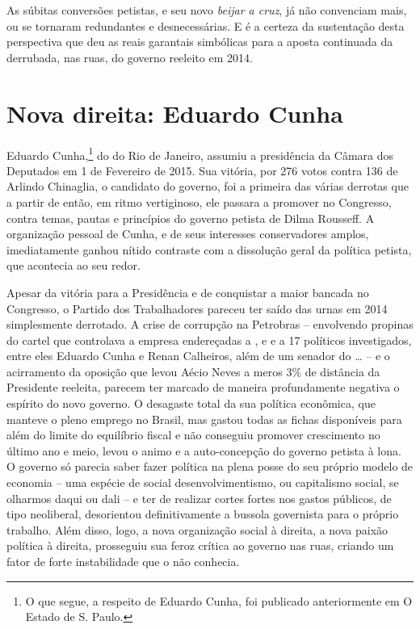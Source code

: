 As súbitas conversões petistas, e seu novo \emph{beijar a cruz}, já não
convenciam mais, ou se tornaram redundantes e desnecessárias. E é a
certeza da sustentação desta perspectiva que deu as reais garantais
simbólicas para a aposta continuada da derrubada, nas ruas, do governo
reeleito em 2014.

  \section[Nova direita: Eduardo Cunha]{Nova direita: Eduardo
    Cunha}\label{nova-direita-eduardo-cunha}

Eduardo Cunha,\footnote{O que segue, a respeito de Eduardo Cunha, foi publicado
  anteriormente em O Estado de S. Paulo.} do  do Rio de Janeiro, assumiu a presidência da
Câmara dos Deputados em 1 de Fevereiro de 2015. Sua vitória, por 276
votos contra 136 de Arlindo Chinaglia, o candidato do governo, foi a
primeira das várias derrotas que a partir de então, em ritmo
vertiginoso, ele passara a promover no Congresso, contra temas, pautas e
princípios do governo petista de Dilma Rousseff. A organização pessoal
de Cunha, e de seus interesses conservadores amplos, imediatamente
ganhou nítido contraste com a dissolução geral da política petista, que
acontecia ao seu redor.

Apesar da vitória para a Presidência e de conquistar a maior bancada no
Congresso, o Partido dos Trabalhadores pareceu ter saído das urnas em
2014 simplesmente derrotado. A crise de corrupção na Petrobras --
envolvendo propinas do cartel que controlava a empresa endereçadas a ,
 e  e a 17 políticos investigados, entre eles Eduardo Cunha e
Renan Calheiros, além de um senador do … -- e o acirramento da
oposição que levou Aécio Neves a meros 3\% de distância da Presidente
reeleita, parecem ter marcado de maneira profundamente negativa o
espírito do novo governo. O desagaste total da sua política econômica,
que manteve o pleno emprego no Brasil, mas gastou todas as fichas
disponíveis para além do limite do equilíbrio fiscal e não conseguiu
promover crescimento no último ano e meio, levou o animo e a
auto-concepção do governo petista à lona. O governo só parecia saber
fazer política na plena posse do seu próprio modelo de economia -- uma
espécie de social desenvolvimentismo, ou capitalismo social, se olharmos
daqui ou dali -- e ter de realizar cortes fortes nos gastos públicos, de
tipo neoliberal, desorientou definitivamente a bussola governista para o
próprio trabalho. Além disso, logo, a nova organização social à direita,
a nova paixão política à direita, prosseguiu sua feroz crítica ao
governo nas ruas, criando um fator de forte instabilidade que o  não
conhecia.

